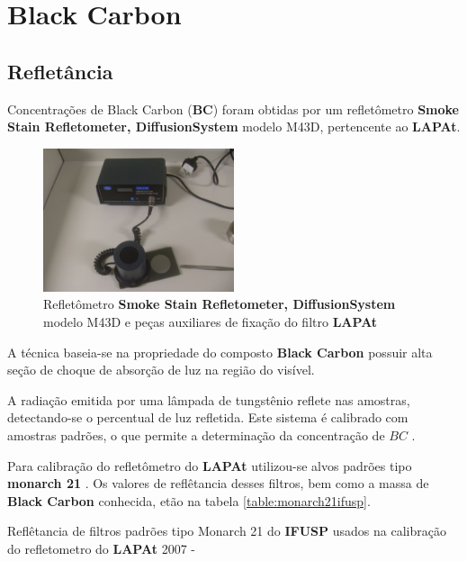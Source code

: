 \section{Black Carbon}

\subsection{Refletância}

Concentrações de Black Carbon (\textbf{BC}) foram obtidas por um 
refletômetro \textbf{Smoke Stain Refletometer, DiffusionSystem} modelo M43D, 
pertencente ao \textbf{LAPAt}.

\begin{figure}[H]
  \centering
  \includegraphics[width=0.5\textwidth]{../inputs/images/refletometro.jpg}
  \caption{Refletômetro \textbf{Smoke Stain Refletometer, DiffusionSystem} modelo M43D 
           e peças auxiliares de fixação do filtro \textbf{LAPAt}}
\end{figure}

A técnica baseia-se na propriedade do composto \textbf{Black Carbon} 
possuir alta seção de choque de absorção de luz na região do visível.

A radiação emitida por uma lâmpada de tungstênio reflete nas amostras, 
detectando-se o percentual de luz refletida. Este sistema é calibrado 
com amostras padrões, o que permite a determinação da concentração de $BC$
\citep{lack2014}.

Para calibração do refletômetro do \textbf{LAPAt} utilizou-se alvos padrões
tipo \textbf{monarch 21} \citep{clarke1986}. Os valores de reflêtancia 
desses filtros, bem como a massa de \textbf{Black Carbon} conhecida,
etão na tabela \ref{table:monarch21ifusp}.

\begin{table}[H]
 \centering
  \begin{scriptsize}
    
  \end{scriptsize}
  \caption{Reflêtancia de filtros padrões tipo Monarch 21 \citep{clarke1986} 
           do \textbf{IFUSP} usados na calibração do refletometro do 
           \textbf{LAPAt} 2007 - \label{table:monarch21ifusp}}
\end{table}

